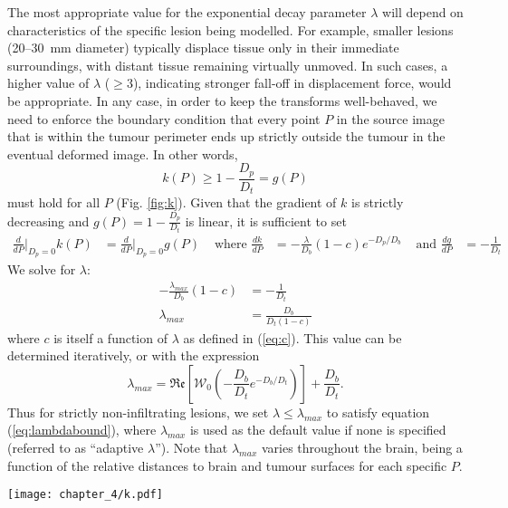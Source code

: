 \documentclass[12pt,phd,a4paper,twoside]{ucl_thesis}
\renewcommand{\textcite}[2][]{
\ifthenelse { \equal {#1} {} }  {\citeauthor{#2}\autocite{#2}}   {\citeauthor{#1}\autocite{#2}}}
\begin{document}
The most appropriate value for the exponential decay parameter $\lambda$ will depend on characteristics of the specific lesion being modelled.
For example, smaller lesions (20--30~mm diameter) typically displace tissue only in their immediate surroundings, with distant tissue remaining virtually unmoved.
In such cases, a higher value of $\lambda$ ($\geq 3$), indicating stronger fall-off in displacement force, would be appropriate.
In any case, in order to keep the transforms well-behaved, we need to enforce the boundary condition that every point $P$ in the source image that is within the tumour perimeter ends up strictly outside the tumour in the eventual deformed image.
In other words,
\begin{equation}\label{eq:lambdabound}
  k(P) \geq 1 - \frac{D_p}{D_t} = g(P)
\end{equation}
must hold for all $P$ (Fig. \ref{fig:k}).
Given that the gradient of $k$ is strictly decreasing and $g(P) = 1 - \frac{D_p}{D_t}$ is linear, it is sufficient to set
\begin{align*}
  \frac{d}{dP}\bigg\rvert_{D_p=0}k(P) &= \frac{d}{dP}\bigg\rvert_{D_p=0}g(P) &\text{ where } \frac{dk}{dP} &= -\frac{\lambda}{D_b}(1-c)e^{-D_p/D_b} &\text{ and } \frac{dg}{dP} &= -\frac{1}{D_t}
\end{align*}
We solve for $\lambda$:
\begin{align*}
  -\frac{\lambda_{max}}{D_b}(1-c) &= -\frac{1}{D_t} \\
  \lambda_{max} &= \frac{D_b}{D_t (1-c)}
\end{align*}
where $c$ is itself a function of $\lambda$ as defined in (\ref{eq:c}). This value can be determined iteratively, or with the expression
\begin{equation}
  \lambda_{max} = \mathfrak{Re} \left[ \mathcal{W}_0(-\frac{D_b}{D_t}e^{-D_b/D_t}) \right] +\frac{D_b}{D_t}.
\end{equation}
Thus for strictly non-infiltrating lesions, we set $\lambda \leq \lambda_{max}$ to satisfy equation (\ref{eq:lambdabound}), where $\lambda_{max}$ is used as the default value if none is specified (referred to as ``adaptive $\lambda$'').
Note that $\lambda_{max}$ varies throughout the brain, being a function of the relative distances to brain and tumour surfaces for each specific $P$.

\begin{SCfigure}[][h!]
  \texttt{[image: chapter\_4/k.pdf]}
  \caption[Deformation factor k]{Deformation factor $k$ as a function of $D_p$. $\lambda$ must be small enough such that $k_{\lambda}$ is strictly above the line $1-(\frac{D_p}{D_t})$ (dashed line). An exponential $k$ with $\lambda_{max}$ is plotted in solid black, compared with a linear $k$ as proposed in \textcite{Nowinski2005} (dotted line).}
  \label{fig:k}
\end{SCfigure}
\end{document}
